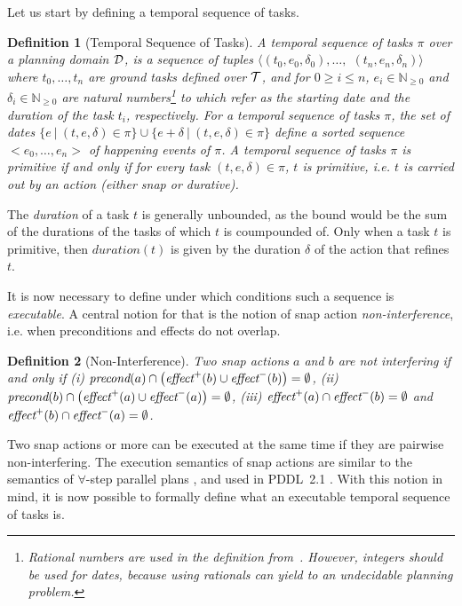 \documentclass[letterpaper]{article} %
\newtheorem{definition}{Definition}
\newcommand{\pre}{\text{\it precond}}
\newcommand{\add}{\text{\it effect}^{+}}
\newcommand{\del}{\text{\it effect}^{-}}
\begin{document}
Let us start by defining a temporal sequence of tasks.
\begin{definition}[Temporal Sequence of Tasks] %
  A \emph{temporal sequence of tasks} $\pi$ over a planning domain $\cal{D}$, is a sequence of tuples $\langle (t_0, e_0, \delta_0), \ldots,$ $(t_n, e_n, \delta_n) \rangle$ where $t_0, \ldots, t_n$ are ground tasks defined over $\cal{T}$, and for $0 \ge i \le n$, $e_i \in \mathbb{N}_{\geq 0}$ and $\delta_i \in \mathbb{N}_{\geq 0}$ are natural numbers\footnote{
    Rational numbers are used in the definition from~\citet{fox03}. However, integers should be used for dates, because using rationals can yield to an undecidable planning problem.}
  to which refer as the starting date and the duration of the task $t_i$, respectively.
  For a temporal sequence of tasks $\pi$, the set of dates $\{e \ | \ (t, e, \delta) \in \pi\} \cup \{e + \delta \ | \ (t, e, \delta) \in \pi\}$  define a sorted sequence $<e_0, \ldots, e_n>$ of \emph{happening events} of $\pi$. %
A temporal sequence of tasks  $\pi$ is primitive if and only if for every task  $(t, e, \delta) \in \pi$, $t$ is primitive, i.e. $t$ is carried out by an action (either snap or durative).
\end{definition}

The \emph{duration} of a task $t$ is generally unbounded, as the bound would be the sum of the durations of the tasks of which $t$ is coumpounded of. Only when a task $t$ is primitive, then $duration(t)$ is given by the duration $\delta$ of the action that refines $t$.


It is now necessary to define under which conditions such a sequence is {\it executable}. A central notion for that is the notion of snap action {\it non-interference}, i.e. when preconditions and effects do not overlap.
\begin{definition}[Non-Interference]
Two snap actions $a$ and $b$ are \emph{not interfering} if and only if (i) $\pre(a) \cap \bigl(\add(b) \cup \del(b)\bigr) = \emptyset$, (ii) $\pre(b) \cap \bigl(\add(a) \cup \del(a)\bigr) = \emptyset$, (iii) $\add(a) \cap \del(b) = \emptyset$ and  $\add(b) \cap \del(a) = \emptyset$.
\end{definition}
Two snap actions or more can be executed at the same time if they are pairwise non-interfering. The execution semantics of snap actions are similar to the semantics of $\forall$-step parallel plans \cite{rintanen06}, and used in PDDL~2.1 \cite{fox03}. With this notion in mind, it is now possible to formally define what an executable temporal sequence of tasks is.
\end{document}
